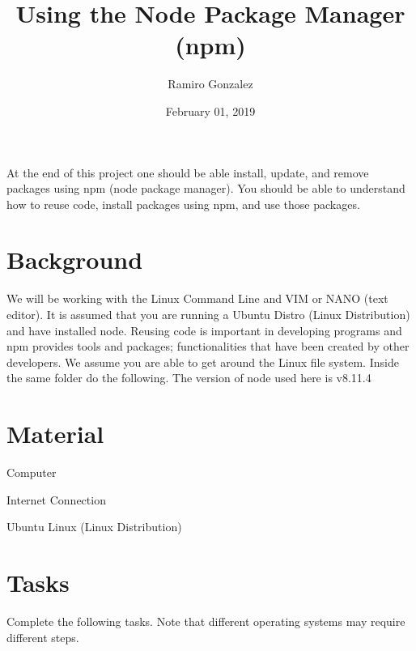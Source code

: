 \documentclass[12pt]{article}
\begin{document}
\title{Using the Node Package Manager (npm) }
\author{Ramiro Gonzalez}
\date{February 01, 2019}

\maketitle

\begin{Objective}
	At the end of this project one should be able install, update, and remove packages using npm (node package manager). You should be able to understand how to reuse code, install packages using npm, and use those packages. 
\end{Objective}

\section*{Background}
  We will be working with the Linux Command Line and VIM or NANO (text editor). It is assumed that you are running a Ubuntu Distro (Linux Distribution) and have installed node. Reusing code is important in developing programs and npm provides tools and packages; functionalities that have been created by other developers. We assume you are able to get around the Linux file system. Inside the same folder do the following. The version of node used here is v8.11.4 
\section*{Material}
 \color{black}
\begin{todolist}
    \item Computer 
    \item Internet Connection
    \item Ubuntu Linux (Linux Distribution) 
\end{todolist}
\section{Tasks}
Complete the following tasks. Note that different operating systems may require different steps. 
\end{document}
